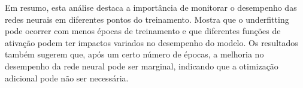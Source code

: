 Em resumo, esta análise destaca a importância de monitorar o desempenho das 
redes neurais em diferentes pontos do treinamento. Mostra que o underfitting 
pode ocorrer com menos épocas de treinamento e que diferentes funções de 
ativação podem ter impactos variados no desempenho do modelo. Os resultados 
também sugerem que, após um certo número de épocas, a melhoria no desempenho da 
rede neural pode ser marginal, indicando que a otimização adicional pode não 
ser necessária.
